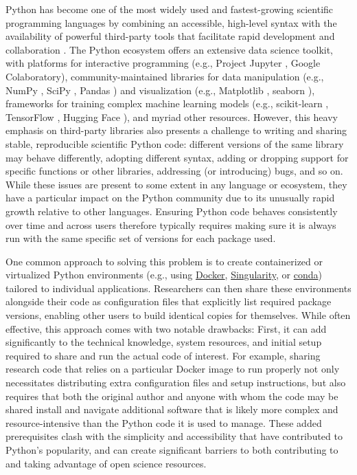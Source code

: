 \documentclass[preprint,12pt, a4paper]{elsarticle}
\begin{document}
Python has become one of the most widely used and fastest-growing scientific programming languages by combining an accessible, high-level syntax with the availability of powerful third-party tools that facilitate rapid development and collaboration \cite{MullEtal15}. 
The Python ecosystem offers an extensive data science toolkit, with platforms for interactive programming (e.g., Project Jupyter \cite{KluyEtal16}, Google Colaboratory), community-maintained libraries for data manipulation (e.g., NumPy \cite{HarrEtal20}, SciPy \cite{VirtEtal20}, Pandas \cite{McKi10}) and visualization (e.g., Matplotlib \cite{Hunt07}, seaborn \cite{Wask21}), frameworks for training complex machine learning models (e.g., scikit-learn \cite{PedrEtal11}, TensorFlow \cite{AbadEtal15}, Hugging Face \cite{WolfEtal20}), and myriad other resources. 
However, this heavy emphasis on third-party libraries also presents a challenge to writing and sharing stable, reproducible scientific Python code: different versions of the same library may behave differently, adopting different syntax, adding or dropping support for specific functions or other libraries, addressing (or introducing) bugs, and so on. 
While these issues are present to some extent in any language or ecosystem, they have a particular impact on the Python community due to its unusually rapid growth relative to other languages. 
Ensuring Python code behaves consistently over time and across users therefore typically requires making sure it is always run with the same specific set of versions for each package used. 

One common approach to solving this problem is to create containerized or virtualized Python environments (e.g., using \href{https://www.docker.com/}{Docker}, \href{https://sylabs.io/singularity/}{Singularity}, or \href{https://docs.conda.io/en/latest/}{conda}) tailored to individual applications. 
Researchers can then share these environments alongside their code as configuration files that explicitly list required package versions, enabling other users to build identical copies for themselves. 
While often effective, this approach comes with two notable drawbacks: 
First, it can add significantly to the technical knowledge, system resources, and initial setup required to share and run the actual code of interest. 
For example, sharing research code that relies on a particular Docker image to run properly not only necessitates distributing extra configuration files and setup instructions, but also requires that both the original author and anyone with whom the code may be shared install and navigate additional software that is likely more complex and resource-intensive than the Python code it is used to manage. 
These added prerequisites clash with the simplicity and accessibility that have contributed to Python's popularity, and can create significant barriers to both contributing to and taking advantage of open science resources.
\end{document}
